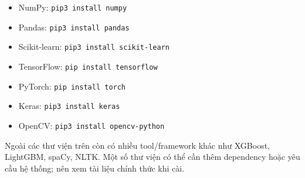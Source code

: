 \begin{phuongphap}[title={Một số thư viện (kèm lệnh cài)}]
\begin{itemize}
  \item NumPy: \texttt{pip3 install numpy}
  \item Pandas: \texttt{pip3 install pandas}
  \item Scikit-learn: \texttt{pip3 install scikit-learn}
  \item TensorFlow: \texttt{pip install tensorflow}
  \item PyTorch: \texttt{pip install torch}
  \item Keras: \texttt{pip3 install keras}
  \item OpenCV: \texttt{pip3 install opencv-python}
\end{itemize}
\end{phuongphap}

\begin{luuy}[title={Ghi chú}]
Ngoài các thư viện trên còn có nhiều tool/framework khác như XGBoost, LightGBM, spaCy, NLTK.
Một số thư viện có thể cần thêm dependency hoặc yêu cầu hệ thống; nên xem tài liệu chính thức khi cài.
\end{luuy}

\begin{vidu}[title={Hình minh hoạ hệ sinh thái Python}]
\end{vidu}

